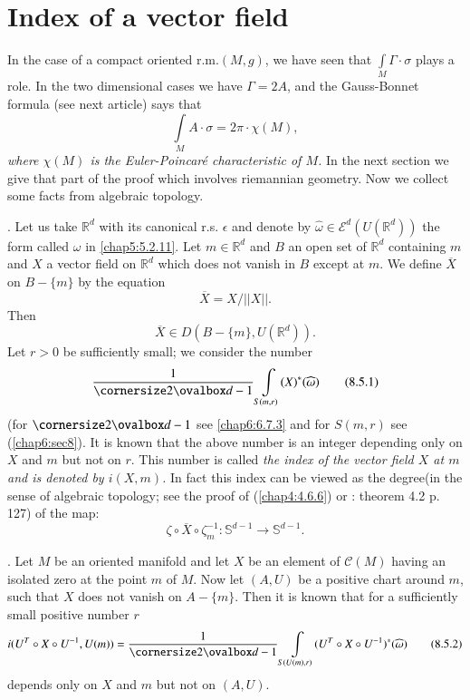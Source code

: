 \section{Index of a vector field}\label{chap8:sec5}\pageoriginale

In the case of a compact oriented r.m.\@ $(M,g)$, we have seen that
$\int\limits_{M}\Gamma\cdot \sigma$ plays a role. In the two
dimensional cases we have $\Gamma=2A$, and the Gauss-Bonnet formula
(see next article) says that
$$
\int\limits_{M}A\cdot \sigma=2\pi\cdot \chi(M),
$$
{\em where $\chi(M)$ is the Euler-Poincar\'e characteristic of $M$.}
In the next section we give that part of the proof which involves
riemannian geometry. Now we collect some facts from algebraic
topology.

. Let us take $\mathbb{R}^{d}$ with its canonical r.s\@.
  $\epsilon$ and denote by
  {\small $\widehat{\omega}\in\mathscr{E}^{d}(U(\mathbb{R}^{d}))$} the form
  called $\omega$ in \eqref{chap5:5.2.11}. Let $m\in \mathbb{R}^{d}$ and $B$
  an open set of $\mathbb{R}^{d}$ containing $m$ and $X$ a vector
  field on $\mathbb{R}^{d}$ which does not vanish in $B$ except at
  $m$. We define $\overline{X}$ on $B-\{m\}$ by the equation
$$
\overline{X}=X/||X||.
$$
Then 
$$
\overline{X}\in D(B-\{m\},U(\mathbb{R}^{d})).
$$
Let $r>0$ be sufficiently small; we consider the number
\begin{equation*}
\frac{1}{\oval{d-1}}\int\limits_{S(m,r)}(X)^{\ast}(\widehat{\omega})\tag{8.5.1}\label{chap8:8.5.1} 
\end{equation*}
(for $\oval{d-1}$ see \eqref{chap6:6.7.3} and for $S(m,r)$ see
(\ref{chap6:sec8}). It is known that the above number is an integer depending
only on $X$ and $m$ but not on $r$. This number is called {\em the
  index of the vector field $X$ at $m$ and is denoted by $i(X,m)$.} In
fact this index can be viewed as the degree\pageoriginale (in the
sense of algebraic topology; see the proof of (\ref{chap4:4.6.6}) or
\cite{35}: theorem 4.2 p. 127) of the map:
\begin{equation*}
\zeta\circ\overline{X}\circ \zeta^{-1}_{m}:\mathbb{S}^{d-1}\to \mathbb{S}^{d-1}.\tag{8.5.1.bis}\label{chap8:8.5.1.bis}
\end{equation*}

. Let $M$ be an oriented manifold and let $X$ be an element of
  $\mathscr{C}(M)$ having an isolated zero at the point $m$ of
  $M$. Now let $(A,U)$ be a positive chart around $m$, such that $X$
  does not vanish on $A-\{m\}$. Then it is known that for a
  sufficiently small positive number $r$
\begin{equation*}
i(U^{T}\circ X\circ U^{-1},
U(m))=\frac{1}{\oval{d-1}}\int\limits_{S(U(m),r)}(U^{T}\circ X\circ
U^{-1})^{\ast}(\widehat{\omega})\tag{8.5.2}\label{chap8:8.5.2}
\end{equation*}
depends only on $X$ and $m$ but not on $(A,U)$.

